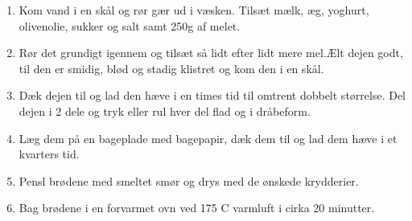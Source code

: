 \documentclass{book}
\begin{document}
\begin{minipage}[t]{0.5\textwidth}
\begin{enumerate}
    \item Kom vand i en skål og rør gær ud i væsken. Tilsæt mælk, æg, yoghurt, olivenolie, sukker og salt samt 250g af  melet. 
    \item Rør det grundigt igennem og tilsæt så lidt efter lidt mere mel.Ælt dejen godt, til den er smidig, blød og stadig klistret og kom den i en skål.
    \item Dæk dejen til og lad den hæve i en times tid til omtrent dobbelt størrelse. Del dejen i 2 dele og tryk eller rul hver del flad og i dråbeform. 
    \item Læg dem på en bageplade med bagepapir, dæk dem til og lad dem hæve i et kvarters tid.
    \item Pensl brødene med smeltet smør og drys med de ønskede krydderier.
    \item Bag brødene i en forvarmet ovn ved 175 \degree C varmluft i cirka 20 minutter.

\end{enumerate}
\end{minipage}
\end{document}
